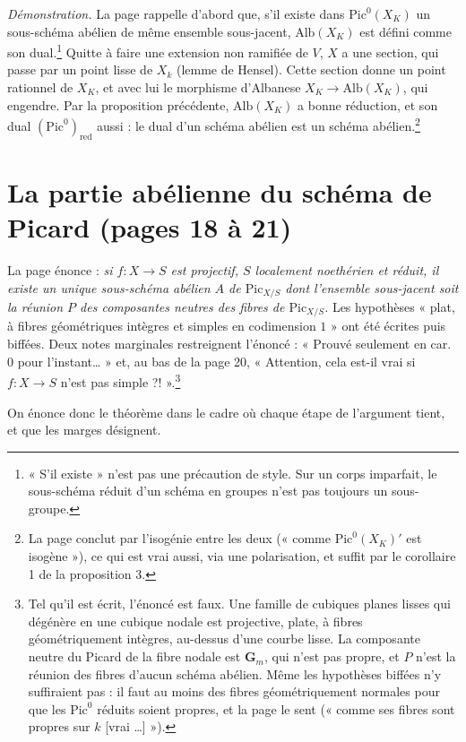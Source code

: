 \documentclass[11pt,a4paper]{article}
\begin{document}
\emph{Démonstration.} La page rappelle d'abord que, s'il existe dans
$\mathrm{Pic}^{0}(X_K)$ un sous-schéma abélien de même ensemble sous-jacent,
$\mathrm{Alb}(X_K)$ est défini comme son dual.\footnote{« S'il existe » n'est
pas une précaution de style. Sur un corps imparfait, le sous-schéma réduit
d'un schéma en groupes n'est pas toujours un sous-groupe.} Quitte à faire une
extension non ramifiée de $V$, $X$ a une section, qui passe par un point lisse
de $X_k$ (lemme de Hensel). Cette section donne un point rationnel de $X_K$,
et avec lui le morphisme d'Albanese $X_K \to \mathrm{Alb}(X_K)$, qui engendre.
Par la proposition précédente, $\mathrm{Alb}(X_K)$ a bonne réduction, et son
dual $(\mathrm{Pic}^{0})_{\mathrm{red}}$ aussi : le dual d'un schéma abélien
est un schéma abélien.\footnote{La page conclut par l'isogénie entre les deux
(« comme $\mathrm{Pic}^{0}(X_K)'$ est isogène »), ce qui est vrai aussi, via
une polarisation, et suffit par le corollaire 1 de la proposition 3.}

\section*{La partie abélienne du schéma de Picard (pages 18 à 21)}

La page énonce : \emph{si $f \colon X \to S$ est projectif, $S$ localement
noethérien et réduit, il existe un unique sous-schéma abélien $A$ de
$\mathrm{Pic}_{X/S}$ dont l'ensemble sous-jacent soit la réunion $P$ des
composantes neutres des fibres de $\mathrm{Pic}_{X/S}$.} Les hypothèses
« plat, à fibres géométriques intègres et simples en codimension $1$ » ont été
écrites puis biffées. Deux notes marginales restreignent l'énoncé :
« Prouvé seulement en car.~$0$ pour l'instant… » et, au bas de la page 20,
« Attention, cela est-il vrai si $f \colon X \to S$ n'est pas simple
?! ».\footnote{Tel qu'il est écrit, l'énoncé est faux. Une famille de cubiques
planes lisses qui dégénère en une cubique nodale est projective, plate, à
fibres géométriquement intègres, au-dessus d'une courbe lisse. La composante
neutre du Picard de la fibre nodale est $\mathbf{G}_m$, qui n'est pas propre, et
$P$ n'est la réunion des fibres d'aucun schéma abélien. Même les hypothèses
biffées n'y suffiraient pas : il faut au moins des fibres géométriquement
normales pour que les $\mathrm{Pic}^{0}$ réduits soient propres, et la page le
sent (« comme ses fibres sont propres sur $k$ [vrai …] »).}

On énonce donc le théorème dans le cadre où chaque étape de l'argument
tient, et que les marges désignent.
\end{document}
